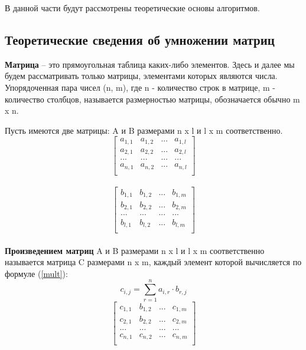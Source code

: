 \documentclass[a4paper, 14pt]{article}
\begin{document}
		В данной части будут рассмотрены теоретические основы алгоритмов.
		

        \subsection{Теоретические сведения об умножении матриц}
        
		\textbf{Матрица} – это прямоугольная таблица каких-либо элементов. Здесь и далее мы будем рассматривать только матрицы, элементами которых являются числа. Упорядоченная пара чисел (n, m), где n - количество строк в матрице, m - количество столбцов, называется размерностью матрицы, обозначается обычно m x n\cite{Beloysov}.
		
		Пусть имеются две матрицы: A и B размерами n x l и l x m соответственно.\\
		\[ \begin{bmatrix}
		a_{1,1} & a_{1,2} & ... & a_{1,l} \\
		a_{2,1} & a_{2,2} & ... & a_{2,l}\\		
		... & ... & ... & ... \\
		a_{n,1} & a_{n, 2} & ... & a_{n,l} \\
		\end{bmatrix} \]\\
				\[ \begin{bmatrix}
		b_{1,1} & b_{1,2} & ... & b_{1,m} \\
		b_{2,1} & b_{2,2} & ... & b_{2,m}\\		
		... & ... & ... & ... \\
		b_{l,1} & b_{l, 2} & ... & b_{l,m} \\
		\end{bmatrix} \]\\
		
		
		\textbf{Произведением матриц} A и B размерами n x l и l x m соответственно называется матрица C размерами n x m, каждый элемент которой вычисляется по формуле (\ref{mult}):\\
		\begin{equation} \label{mult}
		c_{i,j} = \sum\limits_{r=1}^n a_{i,r}\cdot b_{r,j}
		\end{equation}		
		\[ \begin{bmatrix}
		c_{1,1} & b_{1,2} & ... & c_{1,m} \\
		c_{2,1} & b_{2,2} & ... & c_{2,m}\\		
		... & ... & ... & ... \\
		c_{n,1} & c_{n, 2} & ... & c_{n,m} \\
		\end{bmatrix} \]\\
		
\end{document}
